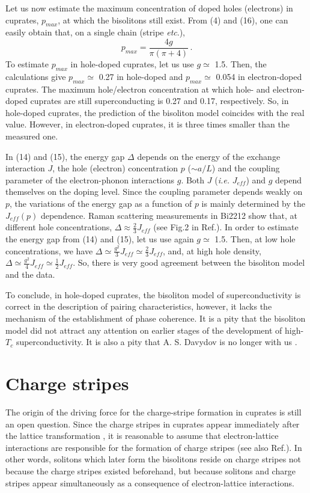 Let us now estimate the maximum concentration of doped holes (electrons) 
in cuprates, $p_{max}$, at which the bisolitons still exist. From (4) and 
(16), one can easily obtain that, on a single chain (stripe {\it etc}.), 
	\[ p_{max} = \frac{4g}{\pi (\pi+4)} \, .\]
To estimate $p_{max}$ in hole-doped cuprates, let us use $g \simeq$ 1.5. 
Then, the calculations give $p_{max} \simeq$ 0.27 in hole-doped and 
$p_{max} \simeq$ 0.054 in electron-doped cuprates. The maximum 
hole/electron concentration at which hole- and electron-doped cuprates 
are still superconducting is 0.27 and 0.17, respectively. So, in hole-doped
cuprates, the prediction of the bisoliton model coincides with the real 
value. However, in electron-doped cuprates, it is three times smaller 
than the measured one. 

In (14) and (15), the energy gap $\Delta$ depends on the energy of the 
exchange interaction $J$, the hole (electron) concentration $p$ 
($\sim a/L$) and the coupling parameter of the electron-phonon 
interactions $g$. Both $J$ ({\em i.e.} $J_{eff}$) and $g$ depend themselves  
on the doping level. Since the coupling parameter depends weakly on $p$, 
the variations of the energy gap as a function of $p$ is mainly determined 
by the $J_{eff}(p)$ dependence. Raman scattering measurements in Bi2212 
show that, at different hole concentrations, $\Delta \approx 
\frac{2}{3}J_{eff}$ (see Fig.2 in Ref.\cite{Klein}). In order to estimate the 
energy gap from (14) and (15), let us use again $g \simeq$ 1.5. Then, at low 
hole concentrations, we have $\Delta \simeq \frac{g^{2}}{3}J_{eff} \simeq 
\frac{2}{3}J_{eff}$, and, at high hole density, $\Delta \simeq 
\frac{g^{2}}{4}J_{eff} \simeq \frac{1}{2}J_{eff}$. So, there is very good 
agreement between the bisoliton model and the data. 

To conclude, in hole-doped cuprates, the bisoliton model of 
superconductivity is correct in the description of pairing 
characteristics, however, it lacks the mechanism of the establishment of 
phase coherence. It is a pity that the bisoliton model did not attract any 
attention on earlier stages of the development of high-$T_{c}$ 
superconductivity. It is also a pity that A. S. Davydov is no longer with us 
\cite{Davydov4}.

\section{Charge stripes}
  
The origin of the driving force for the charge-stripe formation in cuprates
is still an open question. Since the charge stripes in cuprates appear
immediately after the lattice transformation \cite{Tranquada}, it is 
reasonable to assume that electron-lattice interactions are responsible
for the formation of charge stripes (see also Ref.\cite{Khomski}). In other 
words, solitons which later form the bisolitons reside on charge stripes 
not because the charge stripes existed beforehand, but because solitons 
and charge stripes appear simultaneously as a consequence of 
electron-lattice interactions. 

